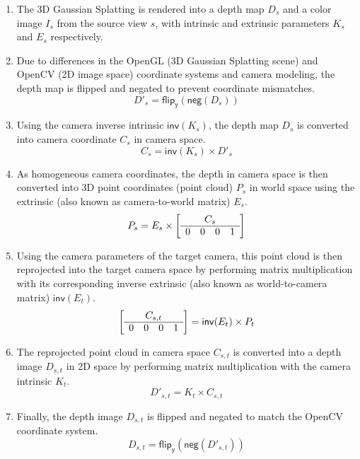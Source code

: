 \begin{enumerate}
	\item The 3D Gaussian Splatting is rendered into a depth map $D_s$ and a color image $I_s$ from the source view $s$, with intrinsic and extrinsic parameters $K_s$ and $E_s$ respectively.
	\item Due to differences in the OpenGL (3D Gaussian Splatting scene) and OpenCV (2D image space) coordinate systems and camera modeling, the depth map is flipped and negated to prevent coordinate mismatches.
	\begin{equation}
		\label{eq:eq:cv-to-gl}
		D'_s = \mathsf{flip_{y}}(\mathsf{neg}(D_s))
	\end{equation}
	\item Using the camera inverse intrinsic $\mathsf{inv}(K_s)$, the depth map $D_s$ is converted into camera coordinate $C_s$ in camera space.
	\begin{equation}
		\label{eq:depth_to_camera}
		C_s = \mathsf{inv}(K_s) \times D'_s
	\end{equation}
	\item As homogeneous camera coordinates, the depth in camera space is then converted into 3D point coordinates (point cloud) $P_s$ in world space using the extrinsic (also known as camera-to-world matrix) $E_s$.
	\begin{equation}
		\label{eq:camera_to_world}
		P_s = E_s \times \left[ \begin{array}{cccc}
			\multicolumn{4}{c}{%
			\smash{\scalebox{1}{$C_s$}}} \\
			\hline
			0 & 0 & 0 & 1\\
		\end{array} \right]
	\end{equation}
	\item Using the camera parameters of the target camera, this point cloud is then reprojected into the target camera space by performing matrix multiplication with its corresponding inverse extrinsic (also known as world-to-camera matrix) $\mathsf{inv}(E_t)$.
	\begin{equation}
		\label{eq:world_to_camera}
		\left[ \begin{array}{cccc}
			\multicolumn{4}{c}{%
			\smash{\scalebox{1}{$C_{s,t}$}}} \\
			\hline
			0 & 0 & 0 & 1\\
		\end{array} \right] = \mathsf{inv}(E_t) \times P_t
	\end{equation}
	\item The reprojected point cloud in camera space $C_{s,t}$ is converted into a depth image $D_{s,t}$ in 2D space by performing matrix multiplication with the camera intrinsic $K_t$.
	\begin{equation}
		\label{eq:camera_to_depth}
		D'_{s,t} = K_t \times C_{s,t}
	\end{equation}
	\item Finally, the depth image $D_{s,t}$ is flipped and negated to match the OpenCV coordinate system.
	\begin{equation}
		\label{eq:gl-to-cv}
		D_{s,t} = \mathsf{flip_{y}}(\mathsf{neg}(D'_{s,t}))
	\end{equation}


\end{enumerate}
